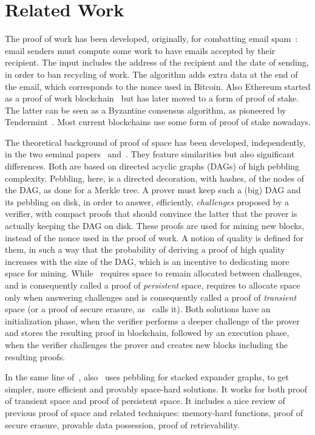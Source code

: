 \section{Related Work}\label{sec:related_work}

The proof of work has been developed, originally, for combatting email spam~\cite{DworkN92}:
email senders must compute some
work to have emails accepted by their recipient. The input includes
the address of the recipient and the date of sending, in order to ban
recycling of work. The algorithm adds extra data at the end of the email,
which corresponds to the nonce used in Bitcoin.
Also Ethereum started as a proof of work blockchain~\cite{AntonopoulosW18} but has later
moved to a form of proof of stake. The latter can be seen as a
Byzantine consensus algorithm, as pioneered by Tendermint~\cite{Tendermint14}.
Most current blockchains use some form of proof of stake nowadays.

The theoretical background of proof of space has been developed, independently,
in the two seminal papers~\cite{AtenieseBFG14} and~\cite{DziembowskiFKP15}.
They feature similarities but also significant differences. Both are based
on directed acyclic graphs (DAGs) of high pebbling complexity.
Pebbling, here, is a directed decoration, with hashes, of the nodes of the DAG, as done for
a Merkle tree.
A prover must keep such a (big) DAG and its pebbling on disk, in order to answer, efficiently,
\emph{challenges} proposed by a verifier, with compact proofs that should convince the latter that
the prover is actually keeping the DAG on disk. These proofs are used for mining new blocks,
instead of the nonce used in the proof of work. A notion of quality is defined for
them, in such a way that the probability of deriving a proof of high quality increases
with the size of the DAG, which is an incentive to dedicating more space for mining.
While~\cite{DziembowskiFKP15} requires space to remain allocated between challenges,
and is consequently called a proof of \emph{persistent} space, \cite{AtenieseBFG14} requires
to allocate space only when answering challenges and is consequently called
a proof of \emph{transient} space (or a proof of secure erasure, as~\cite{DziembowskiFKP15} calls it).
Both solutions have an initialization phase, when the verifier performs a deeper challenge
of the prover and stores the resulting proof in blockchain, followed by an execution phase,
when the verifier challenges the prover and creates new blocks including the resulting proofs.

In the same line of~\cite{AtenieseBFG14,DziembowskiFKP15}, also~\cite{RenD16} uses
pebbling for stacked expander graphs, to get simpler, more efficient and
provably space-hard solutions.
It works for both proof of transient space and proof of persistent space.
It includes a nice review of previous proof of space
and related techniques: memory-hard functions, proof of secure erasure, provable data possession,
proof of retrievability.

